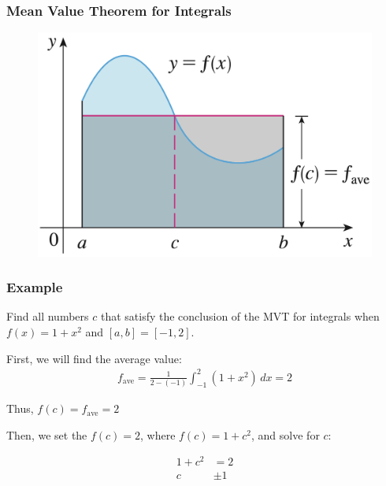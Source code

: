 \documentclass[t]{beamer}
\theoremstyle{plain}
\theoremstyle{definition}
\begin{document}
\begin{frame}

\frametitle{Mean Value Theorem for Integrals}

\begin{figure}[t]
\begin{center}
\includegraphics[scale=0.25]{fig/mvt2}
\end{center}
\end{figure}

\end{frame}

\begin{frame}

\frametitle{Example}

Find all numbers $c$ that satisfy the conclusion of the MVT for integrals when $f(x)=1+x^2$ and $[a,b]=[-1,2]$. \pause
\medskip

First, we will find the average value:
\begin{align*}
f_{\textrm{ave}} = \frac{1}{2-(-1)}\int_{-1}^{2}(1 + x^2) \,dx = 2
\end{align*}

Thus, $f(c) = f_{\textrm{ave}} = 2$

\medskip

Then,  we set the $f(c) = 2$, where $f(c) = 1 + c^2$, and solve for $c$:

\begin{align*}
1 + c^2 &= 2\\
          c & \pm 1
\end{align*}

\end{frame}
\end{document}
